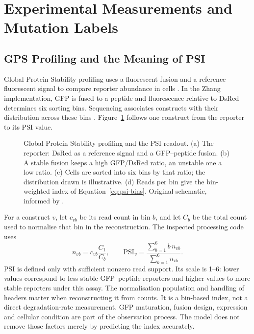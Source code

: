 \section{Experimental Measurements and Mutation Labels}
\subsection{GPS Profiling and the Meaning of PSI}
Global Protein Stability profiling uses a fluorescent fusion and a reference fluorescent signal to
compare reporter abundance in cells \citep{yen2008}. In the Zhang implementation, GFP is fused to a
peptide and fluorescence relative to DsRed determines six sorting bins. Sequencing associates
constructs with their distribution across these bins \citep{zhang2023}. Figure~\ref{fig:gps-assay}
follows one construct from the reporter to its PSI value.

\begin{figure}[htbp]
  \centering
  
  \caption[Global Protein Stability profiling and the PSI readout]{Global Protein Stability profiling and the PSI readout. (a) The reporter: DsRed as a reference signal and a GFP--peptide fusion. (b) A stable fusion keeps a high GFP/DsRed ratio, an unstable one a low ratio. (c) Cells are sorted into six bins by that ratio; the distribution drawn is illustrative. (d) Reads per bin give the bin-weighted index of Equation~\ref{eq:psi-bins}. Original schematic, informed by \citep{yen2008,zhang2023}.}
  \label{fig:gps-assay}
\end{figure}

For a construct $v$, let $c_{vb}$ be its read count in bin $b$, and let $C_b$ be the total count used to
normalise that bin in the reconstruction. The inspected processing code uses
\begin{equation}
 n_{vb}=c_{vb}\frac{C_1}{C_b},\qquad
 \mathrm{PSI}_v=\frac{\sum_{b=1}^{6}b\,n_{vb}}{\sum_{b=1}^{6}n_{vb}}.
 \label{eq:psi-bins}
\end{equation}
PSI is defined only with sufficient nonzero read support. Its scale is 1--6: lower values correspond
to less stable GFP--peptide reporters and higher values to more stable reporters under this assay.
The normalisation population and handling of headers matter when reconstructing it from counts.
It is a bin-based index, not a direct degradation-rate measurement. GFP maturation, fusion design,
expression and cellular condition are part of the observation process. The model does not remove
those factors merely by predicting the index accurately.

